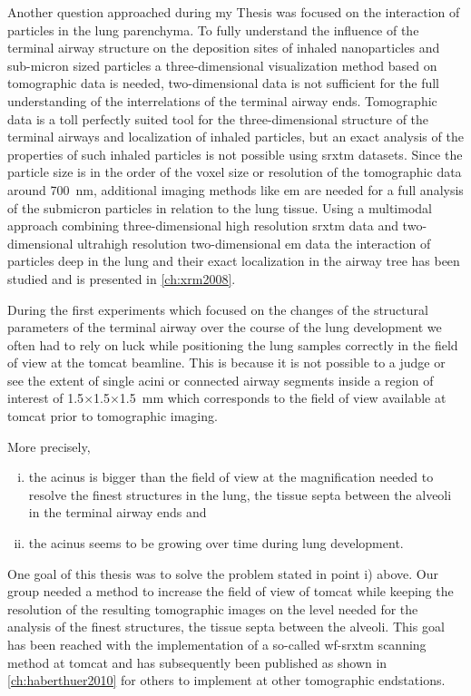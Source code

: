 Another question approached during my Thesis was focused on the interaction of particles in the lung parenchyma. To fully understand the influence of the terminal airway structure on the deposition sites of inhaled nanoparticles and sub-micron sized particles a three-dimensional visualization method based on tomographic data is needed, two-dimensional data is not sufficient for the full understanding of the interrelations of the terminal airway ends. Tomographic data is a toll perfectly suited tool for the three-dimensional structure of the terminal airways and localization of inhaled particles, but an exact analysis of the properties of such inhaled particles is not possible using \ac{srxtm} datasets. Since the particle size is in the order of the voxel size or resolution of the tomographic data around \SI{700}{nm}, additional imaging methods like \ac{em} are needed for a full analysis of the submicron particles in relation to the lung tissue. Using a multimodal approach combining three-dimensional high resolution \ac{srxtm} data and two-dimensional ultrahigh resolution two-dimensional \ac{em} data the interaction of particles deep in the lung and their exact localization in the airway tree has been studied and is presented in \autoref{ch:xrm2008}.

During the first experiments which focused on the changes of the structural parameters of the terminal airway over the course of the lung development we often had to rely on luck while positioning the lung samples correctly in the field of view at the \ac{tomcat} beamline. This is because it is not possible to a judge or see the extent of single acini or connected airway segments inside a region of interest of 1.5$\times$1.5$\times$\SI{1.5}{\milli\meter} which corresponds to the field of view available at \ac{tomcat} prior to tomographic imaging.

More precisely, 
\begin{enumerate}[i)]
	\item the acinus is bigger than the field of view at the magnification needed to resolve the finest structures in the lung, the tissue septa between the alveoli in the terminal airway ends and
	\item the acinus seems to be growing over time during lung development.
\end{enumerate}

One goal of this thesis was to solve the problem stated in point i) above. Our group needed a method  to increase the field of view of \ac{tomcat} while keeping the resolution of the resulting tomographic images on the level needed for the analysis of the finest structures, the tissue septa between the alveoli. This goal has been reached with the implementation of a so-called \ac{wf-srxtm} scanning method at \ac{tomcat} and has subsequently been published as shown in \autoref{ch:haberthuer2010} for others to implement at other tomographic endstations.

